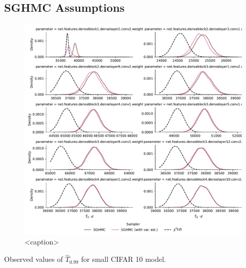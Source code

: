 \subsection{SGHMC Assumptions}
\begin{figure}[htbp]
    \centering
    \includegraphics[width=\linewidth]{Figures/cifar-densenet-temperatures.pdf}
    \caption{<caption>}
    \label{<label>}
\end{figure}

\begin{table}[htbp]
    \centering
    
    \caption{Observed values of $\hat{T}_{0.99}$ for small CIFAR 10 model.}
    \label{tab:cifar-densenet-temperatures}
\end{table}